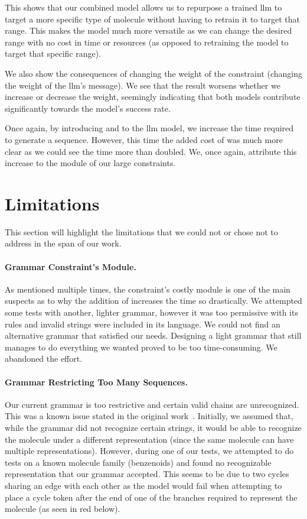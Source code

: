 \documentclass[../Document.tex]{subfiles}
\begin{document}
This shows that our combined model allows us to repurpose a trained \gls{llm} to target a more specific type of molecule without having to retrain it to target that range.
This makes the model much more versatile as we can change the desired range with no cost in time or resources (as opposed to retraining the model to target that specific range).

We also show the consequences of changing the weight of the \oracle constraint (\ie changing the weight of the \gls{llm}'s message).
We see that the result worsens whether we increase or decrease the weight, seemingly indicating that both models contribute significantly towards the model's success rate.

Once again, by introducing \cp and \cpbp to the \gls{llm} model, we increase the time required to generate a sequence.
However, this time the added cost of \bp was much more clear as we could see the time more than doubled. We, once again, attribute this increase to the \bp module of our large constraints.


\section{Limitations}
\label{sec:conc/limitations}
This section will highlight the limitations that we could not or chose not to address in the span of our work.

\paragraph{Grammar Constraint's \bp Module.}
As mentioned multiple times, the \grammar constraint's costly \bp module is one of the main suspects as to why the addition of \bp increases the time so drastically.
We attempted some tests with another, lighter grammar, however it was too permissive with its rules and invalid \smiles strings were included in its language.
We could not find an alternative grammar that satisfied our needs.
Designing a light grammar that still manages to do everything we wanted proved to be too time-consuming. We abandoned the effort. 


\paragraph{Grammar Restricting Too Many Sequences.}
Our current grammar is too restrictive and certain valid \smiles chains are unrecognized. 
This was a known issue stated in the original work~\cite{kraev2018grammars}. 
Initially, we assumed that, while the grammar did not recognize certain \smiles strings, it would be able to recognize the molecule under a different \smiles representation (since the same molecule can have multiple representations).
However, during one of our tests, we attempted to do tests on a known molecule family (benzenoids) and found no recognizable \smiles representation that our grammar accepted.
This seems to be due to two cycles sharing an edge with each other as the model would fail when attempting to place a cycle token after the end of one of the branches required to represent the molecule (as seen in red below).
\end{document}
